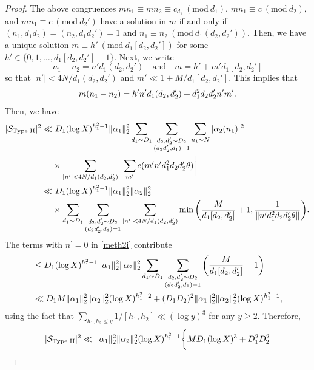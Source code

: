 \documentclass[12pt]{amsart}
\numberwithin{equation}{section}
\theoremstyle{remark}
\theoremstyle{definition}
\newcommand{\imod}[1]{\ (\mathrm{mod}\ #1)}
\begin{document}
\begin{proof}
The above congruences $mn_1 \equiv mn_2 \equiv c_{d_1} \imod {d_1}$, $mn_1\equiv c \imod {d_2}$, and $mn_1\equiv c\imod {d_2'}$ have a solution in $m$ if and only if $(n_1, d_1d_2)=(n_2, d_1d_2')=1$ and $n_1 \equiv n_2\imod {d_1 (d_2, d_2')}$. Then, we have a unique solution $m\equiv h'\imod {d_1[d_2, d_2']}$ for some $h'\in \{0, 1, \dotsc, d_1[d_2, d_2']-1\} $. Next, we write 
\[n_1-n_2=n'd_1(d_2, d_2') \quad \text{and}\quad  m=h'+ m'd_1[d_2, d_2']\]
so that $|n'|< 4N/d_1(d_2, d_2')$ and $m'\ll 1+M/d_1[d_2, d_2']$. This implies that
\begin{align}
\notag m(n_1-n_2)=h'n'd_1(d_2, d_2') + d_1^2d_2d_2'n'm'. 
\end{align}
Then, we have
 \begin{align}
 \notag \lvert\mathcal{S}_{\textup{Type II}}\rvert^2 \ll &~D_1(\log X)^{h_1^2-1}\lVert {\alpha}_1\rVert_2^2 \sum_{\substack{d_1\sim D_1}}\sum_{\substack{d_2, d_2^\prime \sim D_2\\(d_2d_2^\prime, d_1)=1}} \sum_{n_1\sim N}|{\alpha}_2(n_1)|^2\\\notag &\times \sum_{|n^\prime|< 4N/d_1(d_2, d_2^\prime)}\bigg|\sum_{m^\prime}e(m^\prime n^\prime d_1^2d_2d_2^\prime \theta)\bigg|\\
\notag \ll &~D_1(\log X)^{h_1^2-1}\lVert {\alpha}_1\rVert_2^2\lVert {\alpha}_2 \rVert_2^2\\
\label{meth2i}  &\times \sum_{\substack{d_1\sim D_1}}\sum_{\substack{d_2, d_2^\prime \sim D_2\\(d_2d_2^\prime,d_1)=1}}\sum_{|n^\prime|< 4N/d_1(d_2, d_2^\prime)}\min\bigg(\dfrac{M}{d_1[d_2, d_2^\prime]}+1, \dfrac{1}{\|n^\prime d_1^2d_2d_2^\prime\theta\|}\bigg).
 \end{align}
The terms with $n^\prime =0$ in \eqref{meth2i} contribute
 \begin{align}
\notag  &\leq D_1(\log X)^{h_1^2-1}\lVert {\alpha}_1\rVert_2^2\lVert {\alpha}_2 \rVert_2^2 \sum_{\substack{d_1\sim D_1}}\sum_{\substack{d_2, d_2^\prime \sim D_2\\(d_2d_2^\prime, d_1)=1}}\bigg(\dfrac{M}{d_1[d_2,d_2^\prime]} + 1\bigg)\\
\notag & \ll D_1M\lVert {\alpha}_1 \rVert_2^2\lVert {\alpha}_2\rVert_2^2(\log X)^{h_1^2+2} + (D_1D_2)^2\|\alpha_1\|_2^2 \|\alpha_2\|_2^2(\log X)^{h_1^2-1},
 \end{align}
using the fact that $\sum_{h_1, h_2\leq y}1/[h_1, h_2] \ll (\log y)^3$ for any $y\geq 2$. Therefore,
 \begin{align}
\notag \lvert \mathcal{S}_{\textup{Type II}}\rvert^2\ll &~\lVert {\alpha}_1\rVert_2^2\lVert {\alpha}_2 \rVert_2^2(\log X)^{h_1^2-1} \bigg\{MD_1(\log X)^{3} + D_1^2D_2^2\\

\end{align}
\end{proof}
\end{document}
